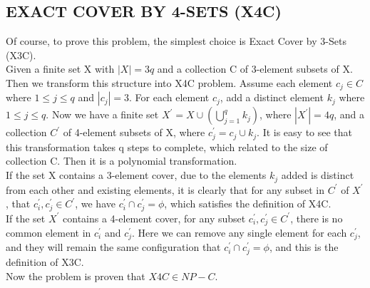 \documentclass[12pt]{report}
\begin{document}
\subsection{EXACT COVER BY 4-SETS (X4C)}
Of course, to prove this problem, the simplest choice is Exact Cover by 3-Sets (X3C). \\
Given a finite set X with $|X|=3q$ and a collection C of 3-element subsets of X. Then we transform this structure into X4C problem. Assume each element $c_{j} \in C$ where $1 \le j \le q$ and $|c_{j}| = 3$. For each element $c_{j}$, add a distinct element $k_{j}$ where $1 \le j \le q$. Now we have a finite set $X^{'} = X \cup (\bigcup_{j=1}^{q}k_{j})$, where $|X^{'}| = 4q$, and a collection $C^{'}$ of 4-element subsets of X, where $c_{j}^{'} = c_{j} \cup k_{j}$. It is easy to see that this transformation takes q steps to complete, which related to the size of collection C. Then it is a polynomial transformation. \\
If the set X contains a 3-element cover, due to the elements $k_{j}$ added is distinct from each other and existing elements, it is clearly that for any subset in $C^{'}$ of $X^{'}$, that $c^{'}_{i}, c^{'}_{j} \in C^{'}$, we have $c^{'}_{i} \cap c^{'}_{j} = \phi$, which satisfies the definition of X4C. \\
If the set $X^{'}$ contains a 4-element cover, for any subset $c^{'}_{i}, c^{'}_{j} \in C^{'}$, there is no common element in $c^{'}_{i}$ and $c^{'}_{j}$. Here we can remove any single element for each $c^{'}_{j}$, and they will remain the same configuration that $c^{'}_{i} \cap c^{'}_{j} = \phi$, and this is the definition of X3C. \\
Now the problem is proven that $X4C \in NP-C$.
\end{document}
